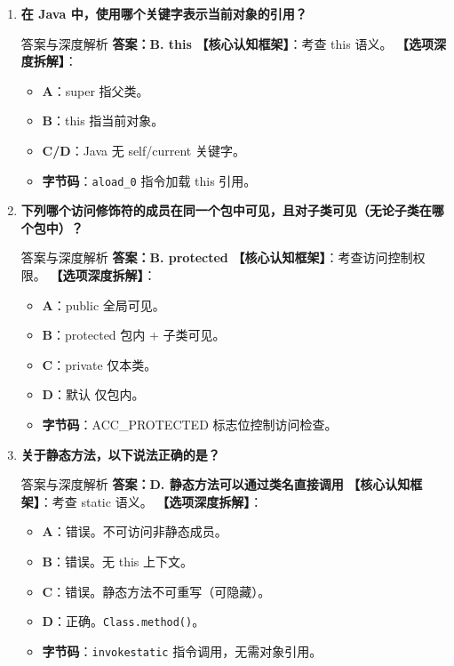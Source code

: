 \documentclass[12pt, a4paper]{ctexart}
\newcommand{\code}[1]{\texttt{\color{myblue}#1}}
\begin{document}
\begin{enumerate}[label=\arabic*.]
\item \textbf{在 Java 中，使用哪个关键字表示当前对象的引用？}
\begin{bluebox}{答案与深度解析}
\textbf{答案：B. this}
\textbf{【核心认知框架】}：考查 this 语义。
\textbf{【选项深度拆解】}：
\begin{itemize}[leftmargin=*, nosep]
    \item \textbf{A}：super 指父类。
    \item \textbf{B}：this 指当前对象。
    \item \textbf{C/D}：Java 无 self/current 关键字。
    \item \textbf{字节码}：\code{aload\_0} 指令加载 this 引用。
\end{itemize}
\end{bluebox}

\item \textbf{下列哪个访问修饰符的成员在同一个包中可见，且对子类可见（无论子类在哪个包中）？}
\begin{bluebox}{答案与深度解析}
\textbf{答案：B. protected}
\textbf{【核心认知框架】}：考查访问控制权限。
\textbf{【选项深度拆解】}：
\begin{itemize}[leftmargin=*, nosep]
    \item \textbf{A}：public 全局可见。
    \item \textbf{B}：protected 包内 + 子类可见。
    \item \textbf{C}：private 仅本类。
    \item \textbf{D}：默认 仅包内。
    \item \textbf{字节码}：ACC\_PROTECTED 标志位控制访问检查。
\end{itemize}
\end{bluebox}

\item \textbf{关于静态方法，以下说法正确的是？}
\begin{bluebox}{答案与深度解析}
\textbf{答案：D. 静态方法可以通过类名直接调用}
\textbf{【核心认知框架】}：考查 static 语义。
\textbf{【选项深度拆解】}：
\begin{itemize}[leftmargin=*, nosep]
    \item \textbf{A}：错误。不可访问非静态成员。
    \item \textbf{B}：错误。无 this 上下文。
    \item \textbf{C}：错误。静态方法不可重写（可隐藏）。
    \item \textbf{D}：正确。\code{Class.method()}。
    \item \textbf{字节码}：\code{invokestatic} 指令调用，无需对象引用。
\end{itemize}
\end{bluebox}


\end{enumerate}
\end{document}

